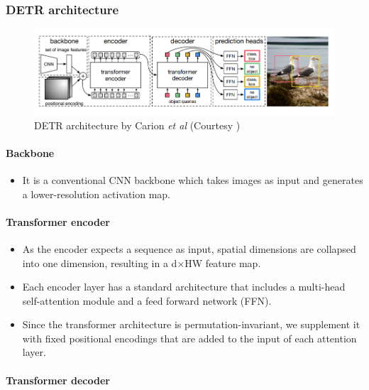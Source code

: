 \subsubsection{DETR architecture}
\begin{figure}[h]
	\centering
	\includegraphics[width=\linewidth]{assets/img/detr-architecture.png}
	\caption{DETR architecture by Carion
		\textit{et al} (Courtesy \cite{carion2020detr})}
\end{figure}
\paragraph{Backbone}

\begin{itemize}
	\item It is a conventional CNN backbone which takes images as input and generates a lower-resolution activation map.
\end{itemize}	

\paragraph{Transformer encoder}

\begin{itemize}
	\item As the encoder expects a sequence as input, spatial dimensions are collapsed into one dimension, resulting in a d×HW feature map.
	\item Each encoder layer has a standard architecture that includes a multi-head self-attention module and a feed forward network (FFN).
	\item Since the transformer architecture is permutation-invariant, we supplement it with fixed positional encodings that are added to the input of each attention layer. 
\end{itemize}	

\paragraph{Transformer decoder}

